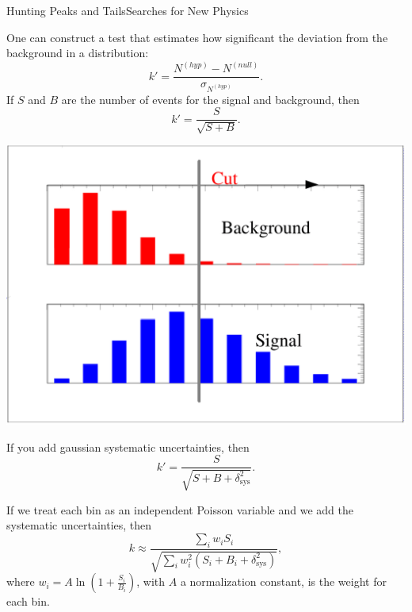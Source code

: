 \documentclass{bredelebeamer}
\begin{document}
\begin{frame}{Hunting Peaks and Tails}{Searches for New Physics}
	\begin{multicols}{2}
		One can construct a test that estimates how significant the deviation from the background in a distribution:
		$$
		k'=\frac{N^{(hyp)}-N^{(null)}}{\sigma_{N^{(hyp)}}}.
		$$
		\vfill
		If $S$ and $B$ are the number of events for the signal and background, then
		$$
		k'=\frac{S}{\sqrt{S+B}}.
		$$

		\begin{center}
			\includegraphics[width=.75\linewidth]{simpleopt-06.png}
		\end{center}
		\pause 
		If you add gaussian systematic uncertainties, then
		$$
		k'=\frac{S}{\sqrt{S+B+\delta_{\text{sys}}^2}}.
		$$

		\pause

		If we treat each bin as an independent Poisson variable and we add the systematic uncertainties, then
		$$
		\boxed{
			k \approx \frac{\sum_i w_i S_i}{\sqrt{\sum_i w_i^2 (S_i+B_i+\delta_{\text{sys}}^2)}},
		}
		$$
		where $w_i = A \ln \left(1+\frac{S_i}{B_i}\right)$, with $A$ a normalization constant, is the weight for each bin.
	\end{multicols}

\end{frame}
\end{document}
